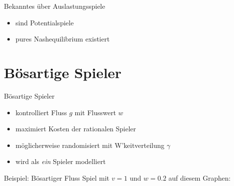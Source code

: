 \documentclass{beamer}
\begin{document}
\begin{frame}{Bekanntes über Auslastungsspiele}
	\begin{itemize}
		\item sind Potentialspiele
		\item pures Nashequilibrium existiert
	\end{itemize}
\end{frame}


\section{Bösartige Spieler}
\begin{frame}{Bösartige Spieler}
	\begin{itemize}
		\item kontrolliert Fluss $g$ mit Flusswert $w$
		\item maximiert Kosten der rationalen Spieler
		\item möglicherweise randomisiert mit W'keitverteilung $\gamma$
		\item wird als \emph{ein} Spieler modelliert
	\end{itemize}
\end{frame}

\begin{frame}{Beispiel: Bösartiger Fluss}
Spiel mit $v = 1$ und $w = 0.2$ auf diesem Graphen:
\begin{figure}
\end{figure}
\end{frame}
\end{document}
